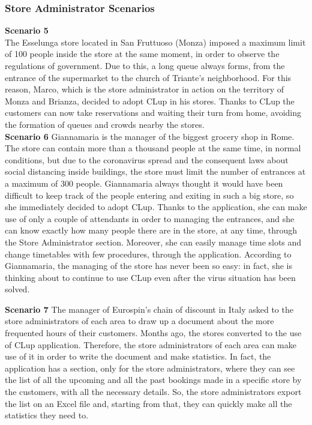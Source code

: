\documentclass[table, 12pt]{article}
\begin{document}
\subsubsection{Store Administrator Scenarios}
\textbf{Scenario 5}\\
The Esselunga store located in San Fruttuoso (Monza) imposed a maximum limit of 100 people inside the store at the same moment, in order to observe the regulations of government. Due to this, a long queue always forms, from the entrance of the supermarket to the church of Triante's neighborhood. For this reason, Marco, which is the store administrator in action on the territory of Monza and Brianza, decided to adopt CLup in his stores.
Thanks to CLup the customers can now take reservations and waiting their turn from home, avoiding the formation of queues and crowds nearby the stores.\\

\textbf{Scenario 6}
Giannamaria is the manager of the biggest grocery shop in Rome. The store can contain more than a thousand people at the same time, in normal conditions, but due to the coronavirus spread and the consequent laws about social distancing inside buildings, the store must limit the number of entrances at a maximum of 300 people. Giannamaria always thought it would have been difficult to keep track of the people entering and exiting in such a big store, so she immediately decided to adopt CLup. Thanks to the application, she can make use of only a couple of attendants in order to managing the entrances, and she can know exactly how many people there are in the store, at any time, through the Store Administrator section. Moreover, she can easily manage time slots and change timetables with few procedures, through the application. According to Giannamaria, the managing of the store has never been so easy: in fact, she is thinking about to continue to use CLup even after the virus situation has been solved.

\textbf{Scenario 7}
The manager of Eurospin's chain of discount in Italy asked to the store administrators of each area to draw up a document about the more frequented hours of their customers. Months ago, the stores converted to the use of CLup application. Therefore, the store administrators of each area can make use of it in order to write the document and make statistics. In fact, the application has a section, only for the store administrators, where they can see the list of all the upcoming and all the past bookings made in a specific store by the customers, with all the necessary details. So, the store administrators export the list on an Excel file and, starting from that, they can quickly make all the statistics they need to.
\end{document}

